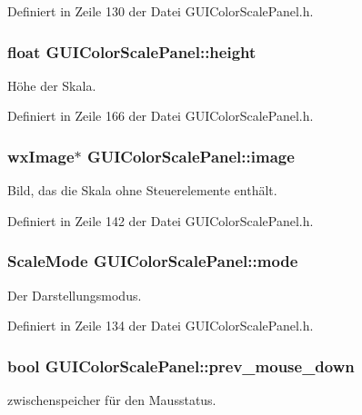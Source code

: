 Definiert in Zeile 130 der Datei G\-U\-I\-Color\-Scale\-Panel.\-h.

\hypertarget{classGUIColorScalePanel_a5bbc9ff741f566a75f757e54324dac5a}{
\subsubsection[{height}]{\setlength{\rightskip}{0pt plus 5cm}float G\-U\-I\-Color\-Scale\-Panel\-::height\hspace{0.3cm}{\ttfamily [private]}}}\label{classGUIColorScalePanel_a5bbc9ff741f566a75f757e54324dac5a}
Höhe der Skala. 

Definiert in Zeile 166 der Datei G\-U\-I\-Color\-Scale\-Panel.\-h.

\hypertarget{classGUIColorScalePanel_ac398e4b12cea263a89db6dd236ec1e87}{
\subsubsection[{image}]{\setlength{\rightskip}{0pt plus 5cm}wx\-Image$\ast$ G\-U\-I\-Color\-Scale\-Panel\-::image\hspace{0.3cm}{\ttfamily [private]}}}\label{classGUIColorScalePanel_ac398e4b12cea263a89db6dd236ec1e87}
Bild, das die Skala ohne Steuerelemente enthält. 

Definiert in Zeile 142 der Datei G\-U\-I\-Color\-Scale\-Panel.\-h.

\hypertarget{classGUIColorScalePanel_ad2f795e0d3a1c8e731da16d3320dbd34}{
\subsubsection[{mode}]{\setlength{\rightskip}{0pt plus 5cm}Scale\-Mode G\-U\-I\-Color\-Scale\-Panel\-::mode\hspace{0.3cm}{\ttfamily [private]}}}\label{classGUIColorScalePanel_ad2f795e0d3a1c8e731da16d3320dbd34}
Der Darstellungsmodus. 

Definiert in Zeile 134 der Datei G\-U\-I\-Color\-Scale\-Panel.\-h.

\hypertarget{classGUIColorScalePanel_ac7050aa7729236561154b0b9be894ed6}{
\subsubsection[{prev\-\_\-mouse\-\_\-down}]{\setlength{\rightskip}{0pt plus 5cm}bool G\-U\-I\-Color\-Scale\-Panel\-::prev\-\_\-mouse\-\_\-down\hspace{0.3cm}{\ttfamily [private]}}}\label{classGUIColorScalePanel_ac7050aa7729236561154b0b9be894ed6}
zwischenspeicher für den Mausstatus. 


